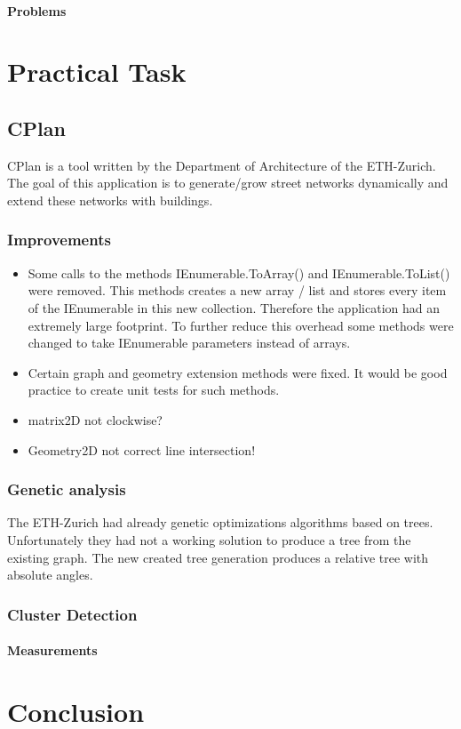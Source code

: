 \documentclass[11pt, a4paper]{report}
\begin{document}
\subsubsection{Problems}

\pagebreak
\chapter{Practical Task}
\section{CPlan}\label{CPlan}
CPlan is a tool written by the Department of Architecture of the ETH-Zurich. The goal of this application is to generate/grow street networks dynamically and extend these networks with buildings. 
\subsection{Improvements}
\begin{itemize}
    \item Some calls to the methods IEnumerable.ToArray() and IEnumerable.ToList() were removed. This methods creates a new array / list and stores every item of the IEnumerable in this new collection. Therefore the application had an extremely large footprint. To further reduce this overhead some methods were changed to take IEnumerable parameters instead of arrays.
    \item Certain graph and geometry extension methods were fixed. It would be good practice to create unit tests for such methods.
    \item matrix2D not clockwise?
    \item Geometry2D not correct line intersection!
\end{itemize}

\subsection{Genetic analysis}
The ETH-Zurich had already genetic optimizations algorithms based on trees. Unfortunately they had not a working solution to produce a tree from the existing graph. The new created tree generation produces a relative tree with absolute angles.

\subsection{Cluster Detection}

\subsubsection{Measurements}
\label{sec:measurements}

\chapter{Conclusion}


\appendix
\glsaddall
\printglossaries
\end{document}
